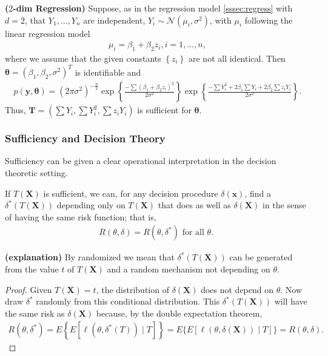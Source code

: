 \documentclass{article}
\newcommand{\bfs}[1]{\textbf{({#1}) }}
\begin{document}
\begin{exma}\bfs{$2$-dim Regression}\label{ex:2d_regress}
 Suppose, as in the regression model \cref{sssec:regress} with $d=2$, that $Y_{1}, \ldots, Y_{n}$ are independent, $Y_{i} \sim \mathcal{N}\left(\mu_{i}, \sigma^{2}\right)$, with $\mu_{i}$ following the linear regression model
\begin{align*}
\mu_{i}=\beta_{1}+\beta_{2} z_{i}, i=1, \ldots, n,
\end{align*}
where we assume that the given constants $\left\{z_{i}\right\}$ are not all identical. Then $\boldsymbol{\theta}=\left(\beta_{1}, \beta_{2}, \sigma^{2}\right)^{T}$ is identifiable and
\begin{align*}
p(\mathbf{y}, \boldsymbol{\theta})=\left(2 \pi \sigma^{2}\right)^{-\frac{n}{2}} \exp \left\{\frac{-\sum\left(\beta_{1}+\beta_{2} z_{i}\right)^{2}}{2 \sigma^{2}}\right\} \exp \left\{\frac{-\sum Y_{i}^{2}+2 \beta_{1} \sum Y_{i}+2 \beta_{2} \sum z_{i} Y_{i}}{2 \sigma^{2}}\right\} .
\end{align*}
Thus, $\mathbf{T}=\left(\sum Y_{i}, \sum Y_{i}^{2}, \sum z_{i} Y_{i}\right)$ is sufficient for $\boldsymbol{\theta}$.
\end{exma}
\subsubsection{Sufficiency and Decision Theory}
Sufficiency can be given a clear operational interpretation in the decision theoretic setting. 
\begin{lema}
If $T(\mathbf{X})$ is sufficient, we can, for any decision procedure $\delta(\mathbf{x})$, find a  $\delta^{*}(T(\mathbf{X}))$ depending only on $T(\mathbf{X})$ that does as well as $\delta(\mathbf{X})$ in the sense of having the same risk function; that is,
\begin{align*}
R(\theta, \delta)=R\left(\theta, \delta^{*}\right) \text { for all } \theta \text {. }
\end{align*}
\end{lema}
\begin{rema}\bfs{explanation}
By randomized we mean that $\delta^{*}(T(\mathbf{X}))$ can be generated from the value $t$ of $T(\mathbf{X})$ and a random mechanism not depending on $\theta$.
\end{rema}
\begin{proof}
Given $T(\mathbf{X})=t$, the distribution of $\delta(\mathbf{X})$ does not depend on $\theta$. Now draw $\delta^{*}$ randomly from this conditional distribution. This $\delta^{*}(T(\mathbf{X}))$ will have the same risk as $\delta(\mathbf{X})$ because, by the double expectation theorem,
\begin{align*}
R\left(\theta, \delta^{*}\right)=E\left\{E\left[\ell\left(\theta, \delta^{*}(T)\right) \mid T\right]\right\}=E\{E[\ell(\theta, \delta(\mathbf{X})) \mid T]\}=R(\theta, \delta) .
\end{align*}
\end{proof}
\end{document}
